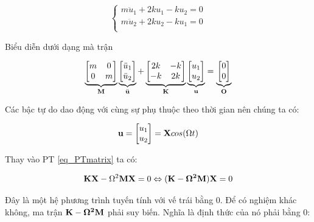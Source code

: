 \begin{equation}\label{eq_PT2dofs}
    \begin{cases}
        m \ddot{u}_1 + 2ku_1 - ku_2 = 0 \\
        m \ddot{u}_2 + 2ku_2 - ku_1 = 0 \\
    \end{cases}
\end{equation}

Biểu diễn dưới dạng mà trận

\begin{equation}
    \label{eq_PTmatrix}
    \underbrace{\begin{bmatrix}
        m & 0\\ 0 & m
    \end{bmatrix}}_{\bf M}\underbrace{\begin{bmatrix}
        \ddot{u}_1 \\ \ddot{u}_2
    \end{bmatrix}}_{\ddot{\bf u}} +\underbrace{\begin{bmatrix}
        2k & -k \\ -k & 2k
    \end{bmatrix}}_{\bf K} \underbrace{\begin{bmatrix}
        u_1 \\ u_2
    \end{bmatrix}}_{\bf u} = \underbrace{\begin{bmatrix}
        0 \\ 0
    \end{bmatrix}}_{\bf O} 
\end{equation}

Các bậc tự do dao động với cùng sự phụ thuộc theo thời gian nên chúng ta có:

\begin{equation}
    {\bf u} = \begin{bmatrix}
        u_1 \\ u_2
    \end{bmatrix} = {\bf X}cos(\Omega t)
\end{equation}

Thay vào PT \cref{eq_PTmatrix} ta có:

\begin{equation}
    {\bf K}{\bf X} - \Omega^2{\bf M}{\bf X} = 0 \Leftrightarrow ({\bf K-\Omega^2{\bf M}}){\bf X} = 0
\end{equation}

Đây là một hệ phương trình tuyến tính với vế trái bằng 0. Để có nghiệm khác không, ma trận $\bf K-\Omega^2{\bf M}$ phải suy biến. Nghĩa là định thức của nó phải bằng 0:

